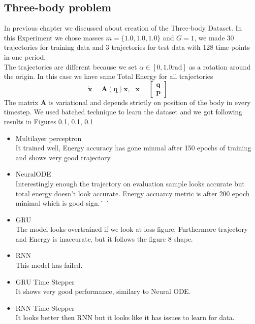 \subsection{Three-body problem}
In previous chapter we discussed about creation of the Three-body Dataset.
In this Experiment we chose masses $m=\{1.0,1.0,1.0\}$ and $G=1$, we made 30 trajectories for training data and 3 trajectories for test data with 128 time points in one period.\\
The trajectories are different because we set $\alpha\in[0,1.0 \text{rad}]$ as a rotation around the origin. In this case we have same Total Energy for all trajectories\\ \begin{equation}
	\dot{\mathbf{x}} = \mathbf{A}(\mathbf{q})\mathbf{x},\text{  }\mathbf{x} = \begin{bmatrix}
		\mathbf{q}\\
		\mathbf{p}
	\end{bmatrix}
\end{equation} The matrix $\mathbf{A}$ is variational and depends strictly on position of the body in every timestep.
We used batched technique to learn the dataset and we got following results in Figures \ref{}, \ref{}, \ref{}
\begin{itemize}
	\item Multilayer perceptron\\
	It trained well, Energy accuracy has gone minmal after 150 epochs of training and shows very good trajectory.

	
	\item NeuralODE\\
	Interestingly enough the trajectory on evaluation sample looks accurate but total energy doesn't look accurate. Energy accuarcy metric is after 200 epoch minimal which is good sign.´   ´

	\item GRU\\
	The model looks overtrained if we look at loss figure. Furthermore trajectory and Energy is inaccurate, but it follows the figure 8 shape. 

	\item RNN\\
	This model has failed.

	\item GRU Time Stepper\\
	It shows very good performance, similary to Neural ODE. 

	\item RNN Time Stepper\\
	It looks better then RNN but it looks like it has issues to learn for data.

\end{itemize}

